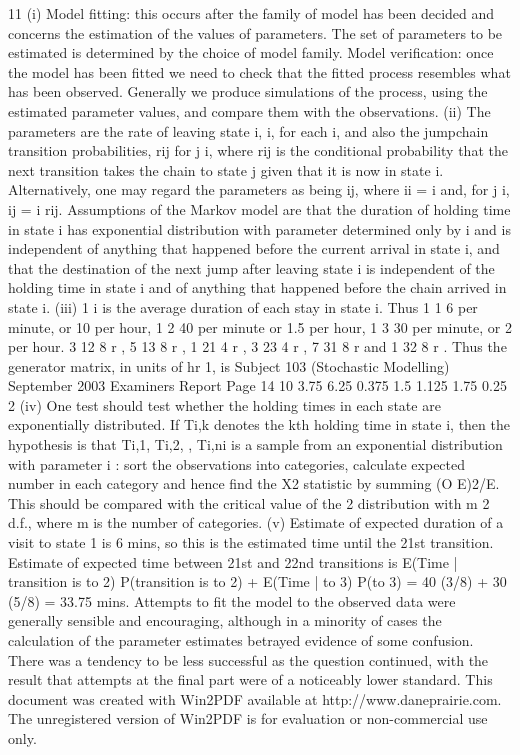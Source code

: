 11 (i) Model fitting: this occurs after the family of model has been decided and
concerns the estimation of the values of parameters. The set of parameters to
be estimated is determined by the choice of model family.
Model verification: once the model has been fitted we need to check that the
fitted process resembles what has been observed. Generally we produce
simulations of the process, using the estimated parameter values, and compare
them with the observations.
(ii) The parameters are the rate of leaving state i, i, for each i, and also the jumpchain
transition probabilities, rij for j i, where rij is the conditional
probability that the next transition takes the chain to state j given that it is now
in state i. Alternatively, one may regard the parameters as being ij, where ii
= i and, for j i, ij = i rij.
Assumptions of the Markov model are that the duration of holding time in
state i has exponential distribution with parameter determined only by i and is
independent of anything that happened before the current arrival in state i, and
that the destination of the next jump after leaving state i is independent of the
holding time in state i and of anything that happened before the chain arrived
in state i.
(iii) 1
i is the average duration of each stay in state i. Thus 1
1 6
per minute, or
10 per hour, 1
2 40
per minute or 1.5 per hour, 1
3 30
per minute, or 2 per
hour.
3
12 8
r , 5
13 8
r , 1
21 4
r , 3
23 4
r , 7
31 8
r and 1
32 8
r .
Thus the generator matrix, in units of hr 1, is
Subject 103 (Stochastic Modelling) September 2003 Examiners Report
Page 14
10 3.75 6.25
0.375 1.5 1.125
1.75 0.25 2
(iv) One test should test whether the holding times in each state are exponentially
distributed. If Ti,k denotes the kth holding time in state i, then the hypothesis is
that Ti,1, Ti,2, , Ti,ni is a sample from an exponential distribution with
parameter i : sort the observations into categories, calculate expected number
in each category and hence find the X2 statistic by summing (O E)2/E. This
should be compared with the critical value of the 2 distribution with m 2
d.f., where m is the number of categories.
(v) Estimate of expected duration of a visit to state 1 is 6 mins, so this is the
estimated time until the 21st transition.
Estimate of expected time between 21st and 22nd transitions is
E(Time | transition is to 2) P(transition is to 2) + E(Time | to 3) P(to 3)
= 40 (3/8) + 30 (5/8) = 33.75 mins.
Attempts to fit the model to the observed data were generally sensible and encouraging,
although in a minority of cases the calculation of the parameter estimates betrayed evidence
of some confusion. There was a tendency to be less successful as the question continued,
with the result that attempts at the final part were of a noticeably lower standard.
This document was created with Win2PDF available at http://www.daneprairie.com.
The unregistered version of Win2PDF is for evaluation or non-commercial use only.
